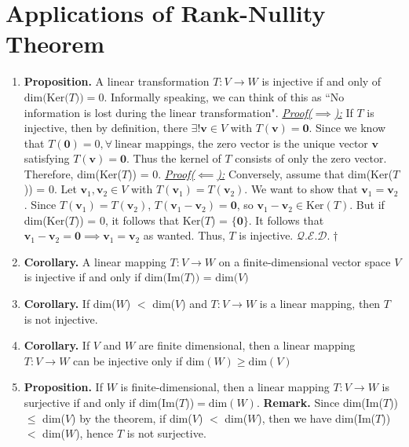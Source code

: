 \documentclass[oneside, 12pt]{book}
\newcommand{\settag}[1]{\renewcommand{\theenumi}{#1}}
\newcommand{\qed}{\hfill $\mathcal{Q}.\mathcal{E}.\mathcal{D}.\dagger$}
\newcommand{\tbf}[1]{\textbf{#1}}
\newcommand{\tit}[1]{\textit{#1}}
\newcommand{\proofforward}{\tit{\underline{Proof($\implies$):}}}
\newcommand{\proofback}{\tit{\underline{Proof($\impliedby$):}}}
\newcommand{\trans}[3]{$#1:#2\rightarrow{}#3$}
\newcommand{\dime}[1]{\text{dim}(#1)}
\newcommand{\para}[1]{\item \tbf{#1}}
\newcommand{\vv}{\mathbf{v}}
\begin{document}
\section{Applications of Rank-Nullity Theorem}
    \begin{enumerate}
        \settag{2.4.2}
        \para{Proposition.} A linear transformation $T:V\rightarrow{} W$ is injective if and only of $\text{dim(Ker}(T\text{))}=0$. Informally speaking, we can think of this as ``No information is lost during the linear transformation". \newline
        \proofforward \newline
            If $T$ is injective, then by definition, there $\exists!\vv \in V$ with $T(\vv) = \mathbf{0}$. Since we know that $T(\mathbf{0}) = 0, \forall~\text{linear mappings}$, the zero vector is the unique vector $\vv$ satisfying $T(\vv) = \mathbf{0}$. Thus the kernel of $T$ consists of only the zero vector. Therefore, dim(Ker($T$)) = 0. \newline
        \proofback \newline
            Conversely, assume that dim(Ker($T$)) = 0. Let $\vv_1, \vv_2 \in V$ with $T(\vv_1) = T(\vv_2)$. We want to show that $\vv_1 = \vv_2$. Since $T(\vv_1) = T(\vv_2)$, $T(\vv_1 - \vv_2) = \mathbf{0}$, so $\vv_1 - \vv_2 \in \text{Ker}(T)$. But if dim(Ker($T$)) = 0, it follows that Ker($T$) = $\{\mathbf{0}\}$. It follows that $\vv_1 - \vv_2 = \mathbf{0} \implies \vv_1 = \vv_2$ as wanted. Thus, $T$ is injective. \qed
            
        \settag{2.4.3}
        \para{Corollary.} A linear mapping $T:V\rightarrow{} W$ on a finite-dimensional vector space $V$ is injective if and only if $\text{dim(Im(}T\text{)) = dim(}V\text{)}$
        
        \settag{2.4.4}
        \para{Corollary.} If dim($W$) $<$ dim($V$) and \trans{T}{V}{W} is a linear mapping, then $T$ is not injective.
        
        \settag{2.4.5}
        \para{Corollary.} If $V$ and $W$ are finite dimensional, then a linear mapping \trans{T}{V}{W} can be injective only if $\dime{W} \geq \dime{V}$
        
        \settag{2.4.7}
        \para{Proposition.} If $W$ is finite-dimensional, then a linear mapping \trans{T}{V}{W} is surjective if and only if dim(Im($T$))$ =\dime{W}$. \newline
        \textbf{Remark.} Since dim(Im($T$)) $\leq$ dim($V$) by the theorem, if dim($V$) $<$ dim($W$), then we have dim(Im($T$)) $<$ dim($W$), hence $T$ is not surjective.
        

\end{enumerate}
\end{document}
